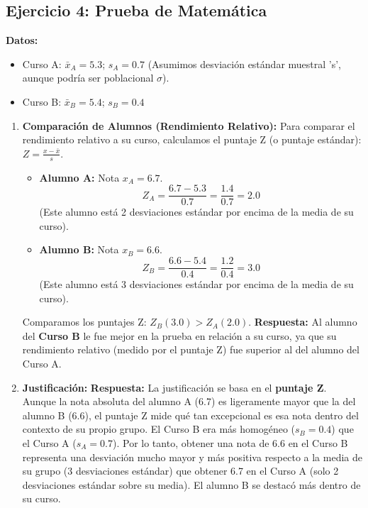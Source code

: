 \documentclass[12pt, a4paper]{article} %
\newcommand{\mean}[1]{\ensuremath{\bar{#1}}} %
\newcommand{\stdev}{\ensuremath{s}} %
\newcommand{\pstdev}{\ensuremath{\sigma}} %
\begin{document}
\subsection*{Ejercicio 4: Prueba de Matemática}
\textbf{Datos:}
\begin{itemize}[nosep]
    \item Curso A: $\mean{x}_A = \num{5,3}$; $\stdev_A = \num{0,7}$ (Asumimos desviación estándar muestral 's', aunque podría ser poblacional $\pstdev$).
    \item Curso B: $\mean{x}_B = \num{5,4}$; $\stdev_B = \num{0,4}$
\end{itemize}

\begin{enumerate}
    \item \textbf{Comparación de Alumnos (Rendimiento Relativo):}
    Para comparar el rendimiento relativo a su curso, calculamos el puntaje Z (o puntaje estándar): $Z = \frac{x - \mean{x}}{\stdev}$.
    \begin{itemize}[nosep]
        \item \textbf{Alumno A:} Nota $x_A = \num{6,7}$.
          \[ Z_A = \frac{\num{6,7} - \num{5,3}}{\num{0,7}} = \frac{\num{1,4}}{\num{0,7}} = \num{2,0} \]
          (Este alumno está 2 desviaciones estándar por encima de la media de su curso).
        \item \textbf{Alumno B:} Nota $x_B = \num{6,6}$.
          \[ Z_B = \frac{\num{6,6} - \num{5,4}}{\num{0,4}} = \frac{\num{1,2}}{\num{0,4}} = \num{3,0} \]
          (Este alumno está 3 desviaciones estándar por encima de la media de su curso).
    \end{itemize}
    Comparamos los puntajes Z: $Z_B (\num{3,0}) > Z_A (\num{2,0})$.
    \textbf{Respuesta:} Al alumno del \textbf{Curso B} le fue mejor en la prueba en relación a su curso, ya que su rendimiento relativo (medido por el puntaje Z) fue superior al del alumno del Curso A.

    \item \textbf{Justificación:}
    \textbf{Respuesta:} La justificación se basa en el \textbf{puntaje Z}. Aunque la nota absoluta del alumno A (\num{6,7}) es ligeramente mayor que la del alumno B (\num{6,6}), el puntaje Z mide qué tan excepcional es esa nota dentro del contexto de su propio grupo. El Curso B era más homogéneo ($\stdev_B=\num{0,4}$) que el Curso A ($\stdev_A=\num{0,7}$). Por lo tanto, obtener una nota de \num{6,6} en el Curso B representa una desviación mucho mayor y más positiva respecto a la media de su grupo (3 desviaciones estándar) que obtener \num{6,7} en el Curso A (solo 2 desviaciones estándar sobre su media). El alumno B se destacó más dentro de su curso.
\end{enumerate}
\end{document}
